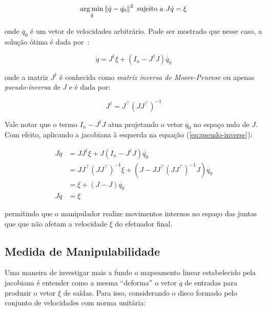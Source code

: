 \begin{equation}
    \operatorname*{arg\,min}_{\dot{q}} \left\Vert \dot{q} - \dot{q_0} \right\Vert^2 \text{ sujeito a } J \dot{q} = \xi
\end{equation}

onde \(\dot{q_0}\) é um vetor de velocidades arbitrário. Pode ser mostrado que nesse caso, 
a solução ótima é dada por~\cite{siciliano_robotics_2009}:

\begin{equation}\label{eq:pseudo-inverse}
    \dot{q} = J^\dag \xi + (I_n - J^\dag J) \dot{q_0}
\end{equation}

onde a matriz \(J^\dag\) é conhecida como \emph{matriz inversa de Moore-Penrose} ou apenas
\emph{pseudo-inversa} de \(J\) e é dada por:

\begin{equation}
    J^\dag = J^\top {(J J^\top)}^{-1}
\end{equation}

Vale notar que o termo \(I_n - J^\dag J\) atua projetando o vetor \(\dot{q_0}\)
no espaço nulo de \(J\). Com efeito, aplicando a jacobiana à esquerda na
equação (\ref{eq:pseudo-inverse}):

\begin{align*}
    J \dot{q} & = J J^\dag \xi + J (I_n - J^\dag J) \dot{q_0}                                   \\
              & = J J^\top {(J J^\top)}^{-1} \xi + (J - J J^\top {(J J^\top)}^{-1} J) \dot{q_0} \\
              & = \xi + (J - J) \dot{q_0}                                                       \\
    J \dot{q} & = \xi
\end{align*}

permitindo que o manipulador realize movimentos internos no espaço das juntas
que que não afetam a velocidade \(\xi\) do efetuador final.

\subsection{Medida de Manipulabilidade}

Uma maneira de investigar mais a fundo o mapeamento linear estabelecido pela
jacobiana é entender como a mesma ``deforma'' o vetor \(\dot{q}\) de entradas
para produzir o vetor \(\xi\) de saídas. Para isso, considerando o disco
formado pelo conjunto de velocidades com norma unitária:

